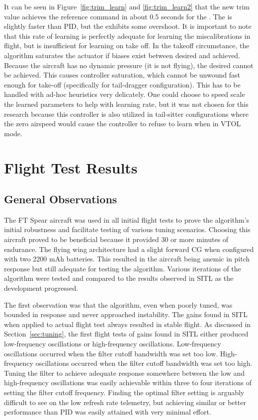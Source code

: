 It can be seen in Figure~\ref{fig:trim_learn} and \ref{fig:trim_learn2} that the new trim value achieves the reference command in about 0.5 seconds for the \Lone.  The \Lone is slightly faster than \ac{PID}, but the \Lone exhibits some overshoot.  It is important to note that this rate of learning is perfectly adequate for learning the miscalibrations in flight, but is insufficient for learning on take off.  In the takeoff circumstance, the algorithm saturates the actuator if biases exist between desired and achieved.  Because the aircraft has no dynamic pressure (it is not flying), the desired cannot be achieved.  This causes controller saturation, which cannot be unwound fast enough for take-off (specifically for tail-dragger configuration).  This has to be handled with ad-hoc heuristics very delicately.  One could choose to speed scale the learned parameters to help with learning rate, but it was not chosen for this research because this controller is also utilized in tail-sitter configurations where the zero airspeed would cause the controller to refuse to learn when in \ac{VTOL} mode.

\section{Flight Test Results}\label{sec:flight_test}
\subsection{General Observations}
The FT Spear aircraft was used in all initial flight tests to prove the algorithm's initial robustness and facilitate testing of various tuning scenarios.  Choosing this aircraft proved to be beneficial because it provided 30 or more minutes of endurance.  The flying wing architecture had a slight forward \ac{CG} when configured with two 2200 \ac{mAh} batteries.  This resulted in the aircraft being anemic in pitch response but still adequate for testing the \Lone algorithm.  Various iterations of the algorithm were tested and compared to the results observed in \ac{SITL} as the development progressed.  

The first observation was that the algorithm, even when poorly tuned, was bounded in response and never approached instability.  The gains found in \ac{SITL} when applied to actual flight test always resulted in stable flight.  As discussed in Section~\ref{sec:tuning}, the first flight tests of gains found in \ac{SITL} either produced low-frequency oscillations or high-frequency oscillations.  Low-frequency oscillations occurred when the \Lone filter cutoff bandwidth was set too low.  High-frequency oscillations occurred when the \Lone filter cutoff bandwidth was set too high.  Tuning the filter to achieve adequate response somewhere between the low and high-frequency oscillations was easily achievable within three to four iterations of setting the filter cutoff frequency.  Finding the optimal filter setting is arguably difficult to see on the low refresh rate telemetry, but achieving similar or better performance than \ac{PID} was easily attained with very minimal effort.

